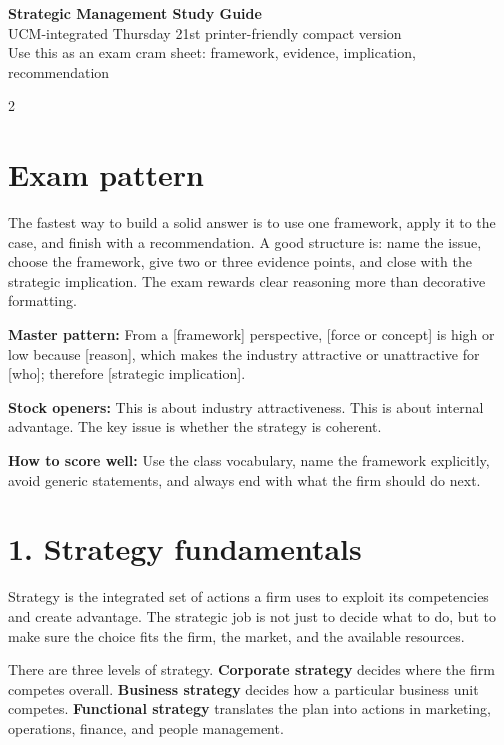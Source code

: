 \documentclass[8pt,letterpaper]{article}
\newcommand{\term}[1]{\textbf{#1}}
\begin{document}
\fontsize{7.2pt}{8.1pt}\selectfont
\raggedbottom

\begin{center}
{\Large\bfseries Strategic Management Study Guide}\\[-1pt]
{UCM-integrated \textbullet{} Thursday 21st \textbullet{} printer-friendly compact version}\\[-1pt]
{Use this as an exam cram sheet: framework, evidence, implication, recommendation}
\end{center}

\begin{multicols}{2}

\section*{Exam pattern}
The fastest way to build a solid answer is to use one framework, apply it to the case, and finish with a recommendation. A good structure is: name the issue, choose the framework, give two or three evidence points, and close with the strategic implication. The exam rewards clear reasoning more than decorative formatting.

\term{Master pattern:} From a [framework] perspective, [force or concept] is high or low because [reason], which makes the industry attractive or unattractive for [who]; therefore [strategic implication].

\term{Stock openers:} This is about industry attractiveness. This is about internal advantage. The key issue is whether the strategy is coherent.

\term{How to score well:} Use the class vocabulary, name the framework explicitly, avoid generic statements, and always end with what the firm should do next.

\section*{1. Strategy fundamentals}
Strategy is the integrated set of actions a firm uses to exploit its competencies and create advantage. The strategic job is not just to decide what to do, but to make sure the choice fits the firm, the market, and the available resources.

There are three levels of strategy. \term{Corporate strategy} decides where the firm competes overall. \term{Business strategy} decides how a particular business unit competes. \term{Functional strategy} translates the plan into actions in marketing, operations, finance, and people management.


\end{multicols}
\end{document}
